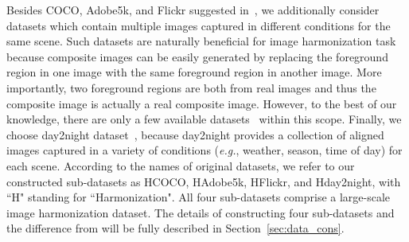 \documentclass[10pt,twocolumn,letterpaper]{article}
\begin{document}
Besides COCO, Adobe5k, and Flickr suggested in~\cite{tsai2017deep}, we additionally consider datasets which contain multiple images captured in different conditions for the same scene. Such datasets are naturally beneficial for image harmonization task because composite images can be easily generated by replacing the foreground region in one image with the same foreground region in another image. More importantly, two foreground regions are both from real images and thus the composite image is actually a real composite image. However, to the best of our knowledge, there are only a few available datasets~\cite{shih2013data, zhou2016evaluating,Laffont14} within this scope.
Finally, we choose day2night dataset~\cite{Laffont14}, because day2night provides a collection of aligned images captured in a variety of conditions (\emph{e.g.}, weather, season, time of day) for each scene. According to the names of original datasets, we refer to our constructed sub-datasets as HCOCO, HAdobe5k, HFlickr, and Hday2night, with ``H" standing for ``Harmonization". All four sub-datasets comprise a large-scale image harmonization dataset. The details of constructing four sub-datasets and the difference from \cite{tsai2017deep} will be fully described in Section~\ref{sec:data_cons}.
\end{document}

